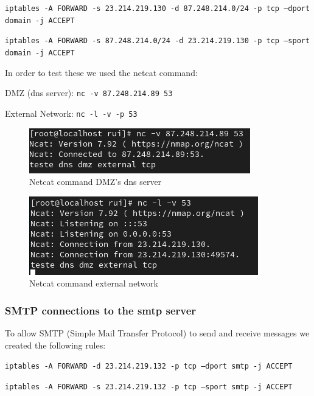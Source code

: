 \documentclass{article}
\begin{document}
\texttt{}\par
\texttt{iptables -A FORWARD -s 23.214.219.130 -d 87.248.214.0/24 -p tcp --dport domain -j ACCEPT}\par
\texttt{iptables -A FORWARD -s 87.248.214.0/24 -d 23.214.219.130 -p tcp --sport domain -j ACCEPT}\par
\texttt{}\par

In order to test these we used the netcat command:
\texttt{}\par
\texttt{}\par
DMZ (dns server): \texttt{nc -v 87.248.214.89 53} \par
External Network: \texttt{nc -l -v -p 53} \par
\texttt{}\par
\begin{figure}[H]
    \centering
    \includegraphics[scale=0.5]{btw/btw_dns_external_tcp_dmz.png}
    \caption{Netcat command DMZ's dns server}
    \label{fig:network-arc}
\end{figure}

\begin{figure}[H]
    \centering
    \includegraphics[scale=0.5]{btw/btw_dns_external_tcp_external.png}
    \caption{Netcat command external network}
    \label{fig:network-arc}
\end{figure}


\subsubsection{SMTP connections to the smtp server}

\texttt{}\par To allow SMTP (Simple Mail Transfer Protocol) to send and receive messages we created the following rules:

\texttt{}\par
\texttt{iptables -A FORWARD -d 23.214.219.132 -p tcp --dport smtp -j ACCEPT}\par
\texttt{iptables -A FORWARD -s 23.214.219.132 -p tcp --sport smtp -j ACCEPT}\par
\texttt{}\par
\end{document}
